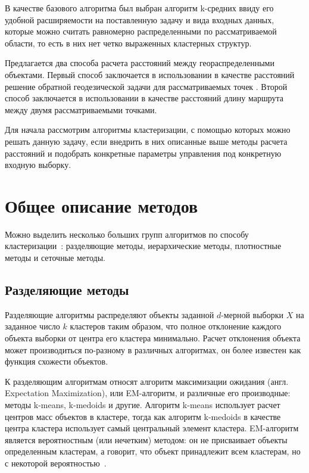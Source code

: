 В качестве базового алгоритма был выбран алгоритм k-средних ввиду его удобной расширяемости на поставленную задачу и вида входных данных, которые можно считать равномерно распределенными по рассматриваемой области, то есть в них нет четко выраженных кластерных структур.

Предлагается два способа расчета расстояний между геораспределенными объектами. Первый способ заключается в использовании в качестве расстояний решение обратной геодезической задачи для рассматриваемых точек \cite{geodesic}. Второй способ заключается в использовании в качестве расстояний длину маршрута между двумя рассматриваемыми точками.

Для начала рассмотрим алгоритмы кластеризации, с помощью которых можно решать данную задачу, если внедрить в них описанные выше методы расчета расстояний и подобрать конкретные параметры управления под конкретную входную выборку.

\section{Общее описание методов}
Можно выделить несколько больших групп алгоритмов по способу кластеризации~\cite{cod}: разделяющие методы, иерархические методы, плотностные методы и сеточные методы.

\subsection{Разделяющие методы}
Разделяющие алгоритмы распределяют объекты заданной \( d \)-мерной выборки \( X \) на заданное число \( k \) кластеров таким образом, что полное отклонение каждого объекта выборки от центра его кластера минимально. Расчет отклонения объекта может производиться по-разному в различных алгоритмах, он более известен как функция схожести объектов.

К разделяющим алгоритмам относят алгоритм максимизации ожидания (англ. Expectation Maximization), или EM-алгоритм, и различные его производные: методы k-means, k-medoids и другие. Алгоритм k-means использует расчет центров масс объектов в кластере, тогда как алгоритм k-medoids в качестве центра кластера использует самый центральный элемент кластера. EM-алгоритм является вероятностным (или нечетким) методом: он не присваивает объекты определенным кластерам, а говорит, что объект принадлежит всем кластерам, но с некоторой вероятностью~\cite{cod, neiskiy, voron, dbscan-pos}.

